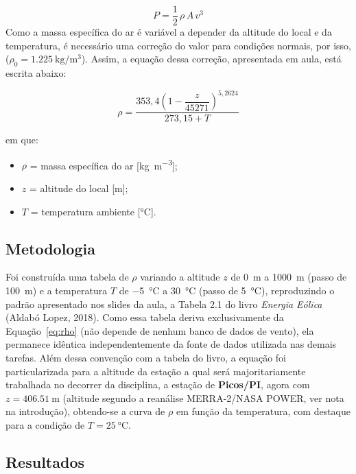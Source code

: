 \documentclass[11pt,a4paper]{article}
\begin{document}
\begin{equation}
    P = \frac{1}{2}\,\rho\, A\, v^3
    \label{eq:potencia}
\end{equation}
Como a massa específica do ar é variável a depender da altitude do local e da temperatura, é necessário uma correção do valor para condições normais, por isso,
($\rho_0 = \SI{1.225}{\kilogram\per\cubic\meter}$). Assim, a equação dessa correção, apresentada em aula, está escrita abaixo:

\begin{equation}
    \rho = \frac{353{,}4\left(1-\dfrac{z}{45271}\right)^{5{,}2624}}{273{,}15+T}
    \label{eq:rho}
\end{equation}

em que:
\begin{itemize}
    \item $\rho$ = massa específica do ar [\si{\kilogram\per\cubic\meter}];
    \item $z$ = altitude do local [\si{\meter}];
    \item $T$ = temperatura ambiente [\si{\celsius}].
\end{itemize}

\subsection{Metodologia}

Foi construída uma tabela de $\rho$ variando a altitude $z$ de
\SI{0}{\meter} a \SI{1000}{\meter} (passo de \SI{100}{\meter}) e a
temperatura $T$ de \SI{-5}{\celsius} a \SI{30}{\celsius} (passo de
\SI{5}{\celsius}), reproduzindo o padrão apresentado nos slides da aula, a Tabela 2.1 do livro
\emph{Energia Eólica} (Aldabó Lopez, 2018). Como essa tabela deriva exclusivamente da Equação~\eqref{eq:rho} (não depende de nenhum banco de dados de vento), ela permanece idêntica independentemente da fonte de dados utilizada nas demais tarefas. Além dessa convenção com a tabela do livro, a equação foi particularizada para a altitude da estação a qual será majoritariamente trabalhada no decorrer da disciplina, a estação de \textbf{Picos/PI}, agora com $z = \SI{406.51}{\meter}$ (altitude segundo a reanálise MERRA-2/NASA POWER, ver nota na introdução), obtendo-se a curva de $\rho$ em função da
temperatura, com destaque para a condição de $T=\SI{25}{\celsius}$.

\subsection{Resultados}
\end{document}
